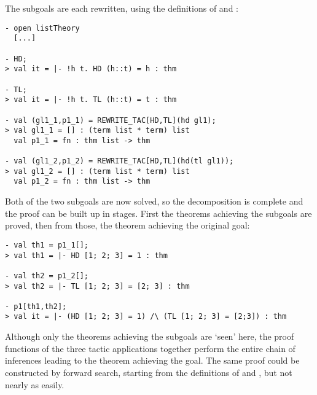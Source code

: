 \noindent The subgoals are each rewritten, using the definitions of
 and :

\begin{session}\begin{verbatim}
- open listTheory
  [...]

- HD;
> val it = |- !h t. HD (h::t) = h : thm

- TL;
> val it = |- !h t. TL (h::t) = t : thm

- val (gl1_1,p1_1) = REWRITE_TAC[HD,TL](hd gl1);
> val gl1_1 = [] : (term list * term) list
  val p1_1 = fn : thm list -> thm

- val (gl1_2,p1_2) = REWRITE_TAC[HD,TL](hd(tl gl1));
> val gl1_2 = [] : (term list * term) list
  val p1_2 = fn : thm list -> thm
\end{verbatim}\end{session}

\noindent Both of the two subgoals are now solved, so the
decomposition is complete and the proof can be built up in stages.
First the theorems achieving the subgoals are proved, then from those,
the theorem achieving the original goal:
\vfill
\newpage
\begin{session}
\begin{verbatim}
- val th1 = p1_1[];
> val th1 = |- HD [1; 2; 3] = 1 : thm

- val th2 = p1_2[];
> val th2 = |- TL [1; 2; 3] = [2; 3] : thm

- p1[th1,th2];
> val it = |- (HD [1; 2; 3] = 1) /\ (TL [1; 2; 3] = [2;3]) : thm
\end{verbatim}
\end{session}

\noindent Although only the theorems achieving the subgoals are `seen' here,
the proof functions of the three tactic applications together perform
the entire chain
 of inferences leading to the theorem achieving the goal.
The same proof could be constructed by forward search, starting from
the definitions of  and , but not nearly as easily.


